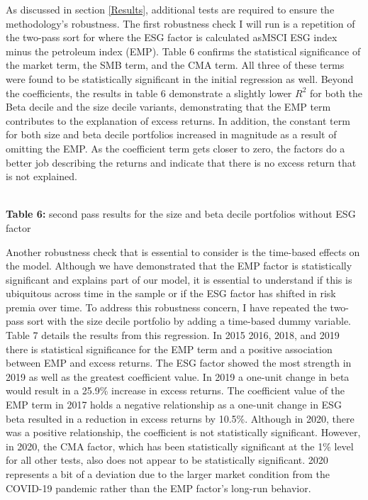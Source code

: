 As discussed in section \ref{Results}, additional tests are required to ensure the methodology's robustness. The first robustness check I will run is a repetition of the two-pass sort for where the ESG factor is calculated asMSCI ESG index minus the petroleum index (EMP). Table 6 confirms the statistical significance of the market term, the SMB term, and the CMA term. All three of these terms were found to be statistically significant in the initial regression as well. Beyond the coefficients,  the results in table 6 demonstrate a slightly lower $R^2$ for both the Beta decile and the size decile variants, demonstrating that the EMP term contributes to the explanation of excess returns. In addition, the constant term for both size and beta decile portfolios increased in magnitude as a result of omitting the EMP. As the coefficient term gets closer to zero, the factors do a better job describing the returns and indicate that there is no excess return that is not explained. 
 
 \begin{center}
    \paperspacingnarrow
    \\
    \textbf{Table 6:} second pass results for the size and beta decile portfolios without ESG factor\\
    \paperspacingwide
\end{center}
Another robustness check that is essential to consider is the time-based effects on the model. Although we have demonstrated that the EMP factor is statistically significant and explains part of our model, it is essential to understand if this is ubiquitous across time in the sample or if the  ESG factor has shifted in risk premia over time. To address this robustness concern, I have repeated the two-pass sort with the size decile portfolio by adding a time-based dummy variable. Table 7 details the results from this regression. In 2015 2016, 2018, and 2019 there is statistical significance for the EMP term and a positive association between EMP and excess returns. The ESG factor showed the most strength in 2019 as well as the greatest coefficient value. In 2019 a one-unit change in beta would result in a 25.9\% increase in excess returns. The coefficient value of the EMP term in 2017  holds a negative relationship as a one-unit change in ESG beta resulted in a reduction in excess returns by 10.5\%. Although in 2020, there was a positive relationship, the coefficient is not statistically significant. However, in 2020, the CMA factor, which has been statistically significant at the 1\% level for all other tests, also does not appear to be statistically significant. 2020 represents a bit of a deviation due to the larger market condition from the COVID-19 pandemic rather than the EMP factor's long-run behavior.


